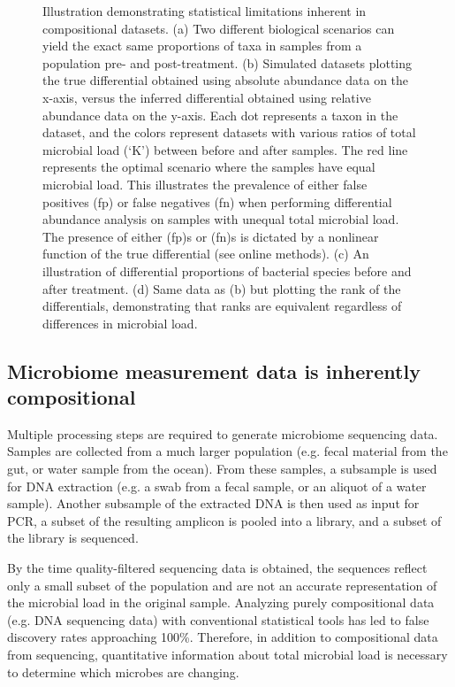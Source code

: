 \begin{figure}
{    Illustration demonstrating statistical limitations inherent in compositional datasets. (a) Two different biological scenarios can yield the exact same proportions of taxa  in samples from a population pre- and post-treatment. (b) Simulated datasets plotting the true differential obtained using absolute abundance data on the x-axis, versus the inferred differential obtained using relative abundance data on the y-axis. Each dot represents a taxon in the dataset, and the colors represent datasets with various ratios of total microbial load (‘K’) between before and after samples. The red line represents the optimal scenario where the samples have equal microbial load. This illustrates the prevalence of either false positives (\gls{fp}) or false negatives (\gls{fn}) when performing differential abundance analysis on samples with unequal total microbial load. The presence of either (\gls{fp})s or (\gls{fn})s is dictated by a nonlinear function of the true differential (see online methods). (c) An illustration of differential proportions of bacterial species before and after treatment. (d) Same data as (b) but plotting the rank of the differentials, demonstrating that ranks are equivalent regardless of differences in microbial load.}
\end{figure}

\subsection{Microbiome measurement data is inherently compositional}

Multiple processing steps are required to generate microbiome sequencing data. Samples are collected from a much larger population (e.g. fecal material from the gut, or water sample from the ocean). From these samples, a subsample is used for DNA extraction (e.g. a swab from a fecal sample, or an aliquot of a water sample). Another subsample of the extracted DNA is then used as input for PCR, a subset of the resulting amplicon is pooled into a library, and a subset of the library is sequenced.

By the time quality-filtered sequencing data is obtained, the sequences reflect only a small subset of the population and are not an accurate representation of the microbial load in the original sample\cite{Vandeputte2017-jl}. Analyzing purely compositional data (e.g. DNA sequencing data) with conventional statistical tools has led to false discovery rates approaching 100\%\cite{Mandal2015-xw,Morton2017-dz}. Therefore, in addition to compositional data from sequencing, quantitative information about total microbial load is necessary to determine which microbes are changing.

